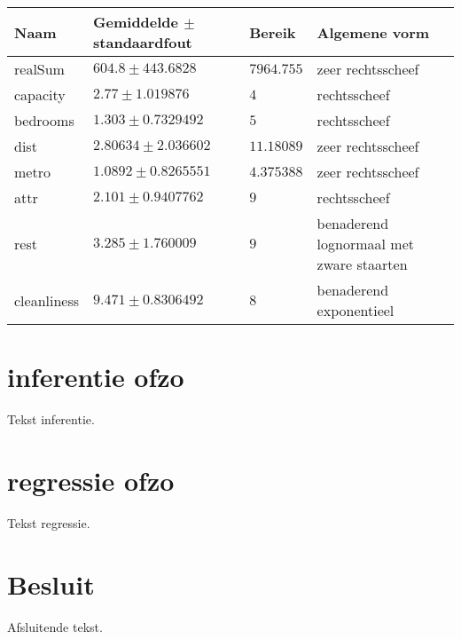 \documentclass[a4paper,kulak]{kulakarticle} %
\begin{document}
	\begin{center}
		\begin{tabular}{| l| l| l|  p{5cm} |}
			\hline
			Naam & Gemiddelde $\pm$ standaardfout  & Bereik & Algemene vorm\\  [0.5ex]
			\hline\hline
			realSum & $604.8\pm 443.6828 $ & $7964.755$  &  zeer rechtsscheef\\   
			\hline
			capacity & $2.77\pm 1.019876$ & $4$  & rechtsscheef \\
			\hline
			bedrooms & $1.303\pm 0.7329492$ & $5$ & rechtsscheef \\
			\hline
			dist & $2.80634\pm 2.036602$  & $11.18089$ & zeer rechtsscheef \\ [1ex] 
			\hline
			metro & $1.0892\pm 0.8265551$ & $4.375388$ & zeer rechtsscheef \\ [1ex] 
			\hline
			attr & $2.101\pm 0.9407762$ & $9$  & rechtsscheef \\ [1ex] 
			\hline
			rest & $3.285\pm 1.760009$ & $9$ & benaderend lognormaal met zware staarten \\ [1ex] 
			\hline
			cleanliness & $9.471\pm 0.8306492$ & $8$ & benaderend exponentieel  \\ [1ex] 
			\hline
		\end{tabular}
	\end{center}
	
	\section{inferentie ofzo}
	
	Tekst inferentie.
	
	\section{regressie ofzo}
	
	Tekst regressie.
	
	\section*{Besluit}
	
	Afsluitende tekst.
	
\end{document}
